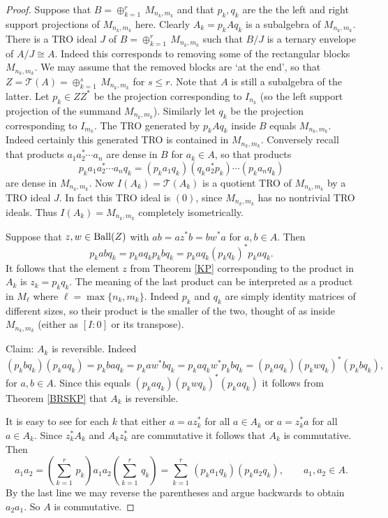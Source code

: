 \documentclass{amsart}
\theoremstyle{remark}
\theoremstyle{definition}
\numberwithin{equation}{section}
\begin{document}
\begin{proof}  Suppose that 
$B = \oplus_{k = 1}^r \, M_{n_k,m_k}$ 
and that $p_k, q_k$ are the 
the left and right support projections of
$M_{n_k,m_k}$ here.  Clearly $A_k = p_k A q_k$  is a  subalgebra of $M_{n_k,m_k}$.  
There is a TRO  ideal $J$ of $B = \oplus_{k = 1}^r \, M_{n_k,m_k}$ such that $B/J$ is a ternary envelope of $A/J \cong A$. 
Indeed this corresponds to removing some of the rectangular blocks $M_{n_k,m_k}$.   We may assume that the removed blocks are `at the end', so that $Z = {\mathcal T}(A) = \oplus_{k = 1}^s \, M_{n_k,m_k}$ for $s \leq r$.  Note that $A$ is still a subalgebra of the latter.  
Let $p_k \in Z Z^*$ be the projection corresponding to $I_{n_k}$  (so the left support projection of the summand $M_{n_k,m_k}$).
Similarly let $q_k$ be the projection corresponding to $I_{m_k}$.
 The TRO  generated by $p_k A q_k$ 
 inside $B$ equals 
 $M_{n_k,m_k}$.  Indeed  certainly this generated  TRO is contained in $M_{n_k,m_k}$.   Conversely recall that 
 products $a_1 a_2^* \cdots a_n$ are dense in $B$ for $a_k \in A$, so that products $$p_k a_1 a_2^* \cdots a_n q_k = (p_k a_1 q_k) (q_k a_2^*p_k)  \cdots (p_k a_n q_k)$$ 
 are dense in $M_{n_k,m_k}$.  Now $I(A_k) = {\mathcal T}(A_k)$ is a quotient TRO of $M_{n_k,m_k}$ by a TRO ideal $J$. 
   In fact this TRO ideal is $(0)$, since $M_{n_k,m_k}$ has no nontrivial TRO ideals. 
   Thus $I(A_k) = M_{n_k,m_k}$ completely isometrically. 

 Suppose that $z , w \in {\rm Ball}(Z)$ with  $ab = az^*b = b w^* a$ for $a, b \in A$.   Then 
   $$p_k a b q_k = p_k a q_k p_k b q_k =  p_k a q_k (p_k q_k)^*  p_k a q_k.$$   It follows that 
  the element $z$ from Theorem \ref{KP} corresponding to the product in $A_k$ is $z_k = p_k q_k$.   The meaning of the last product can be interpreted as a product in $M_\ell$ where $\ell = \max\{ n_k, m_k \}$.   Indeed $p_k$ and $q_k$ are simply identity matrices of different sizes,
  so their product is the smaller of the two, thought of as inside $M_{n_k,m_k}$ (either as $[ I : 0]$ or its transpose).
    
  Claim:  $A_k$ is reversible.      Indeed 
$$(p_k b q_k )(p_k a q_k) = p_k b  a q_k = p_k a w^* b q_k = p_k a q_k w^* p_k b q_k 
= (p_k a q_k ) (p_k w q_k)^*(p_k b q_k),$$
for $a, b \in A.$
Since this equals $(p_k a q_k ) (p_k w q_k)^*(p_k a q_k)$ it follows from Theorem \ref{BRSKP}  that $A_k$ is reversible.   

   It is easy to see for each $k$ that 
  either $a = a z_k^*$ for all $a \in A_k$ or $a = z^*_k a$ for all $a \in A_k$.   Since $z^*_k A_k$ and $A_k z^*_k$ are commutative
  it follows that $A_k$ is commutative.  
  Then 
 $$a_1 a_2 = (\sum_{k=1}^r \, p_k) a_1 a_2  (\sum_{k=1}^r \, q_k) = \sum_{k=1}^r \, (p_k a_1 q_k )(p_k a_2  q_k), \qquad a_1, a_2 \in A.$$
By the last line we may reverse the parentheses and argue backwards to obtain $a_2 a_1$.   So $A$ is commutative. 
\end{proof} 
\end{document}
